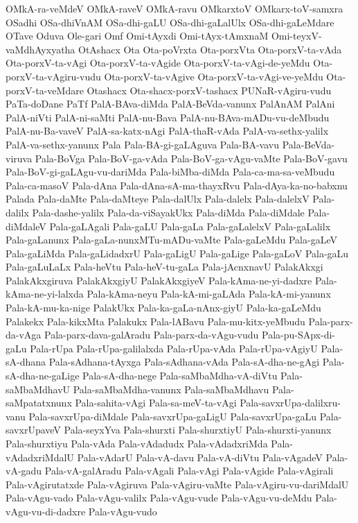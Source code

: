 {OMkA-ra-veMdeV
OMkA-raveV
OMkA-ravu
OMkarxtoV
OMkarx-toV-samxra
OSadhi
OSa-dhiVnAM
OSa-dhi-gaLU
OSa-dhi-gaLalUlx
OSa-dhi-gaLeMdare
OTave
Oduva
Ole-gari
Omf
Omi-tAyxdi
Omi-tAyx-tAmxnaM
Omi-teyxV-vaMdhAyxyatha
OtAshacx
Ota
Ota-poVrxta
Ota-porxVta
Ota-porxV-ta-vAda
Ota-porxV-ta-vAgi
Ota-porxV-ta-vAgide
Ota-porxV-ta-vAgi-de-yeMdu
Ota-porxV-ta-vAgiru-vudu
Ota-porxV-ta-vAgive
Ota-porxV-ta-vAgi-ve-yeMdu
Ota-porxV-ta-veMdare
Otashacx
Ota-shacx-porxV-tashacx
PUNaR-vAgiru-vudu
PaTa-doDane
PaTf
PalA-BAva-diMda
PalA-BeVda-vanunx
PalAnAM
PalAni
PalA-niVti
PalA-ni-saMti
PalA-nu-Bava
PalA-nu-BAva-mADu-vu-deMbudu
PalA-nu-Ba-vaveV
PalA-sa-katx-nAgi
PalA-thaR-vAda
PalA-va-sethx-yalilx
PalA-va-sethx-yanunx
Pala
Pala-BA-gi-gaLAguva
Pala-BA-vavu
Pala-BeVda-viruva
Pala-BoVga
Pala-BoV-ga-vAda
Pala-BoV-ga-vAgu-vaMte
Pala-BoV-gavu
Pala-BoV-gi-gaLAgu-vu-dariMda
Pala-biMba-diMda
Pala-ca-ma-sa-veMbudu
Pala-ca-masoV
Pala-dAna
Pala-dAna-sA-ma-thayxRvu
Pala-dAya-ka-no-babxnu
Palada
Pala-daMte
Pala-daMteye
Pala-dalUlx
Pala-dalelx
Pala-dalelxV
Pala-dalilx
Pala-dashe-yalilx
Pala-da-viSayakUkx
Pala-diMda
Pala-diMdale
Pala-diMdaleV
Pala-gaLAgali
Pala-gaLU
Pala-gaLa
Pala-gaLalelxV
Pala-gaLalilx
Pala-gaLanunx
Pala-gaLa-nunxMTu-mADu-vaMte
Pala-gaLeMdu
Pala-gaLeV
Pala-gaLiMda
Pala-gaLidadxrU
Pala-gaLigU
Pala-gaLige
Pala-gaLoV
Pala-gaLu
Pala-gaLuLaLx
Pala-heVtu
Pala-heV-tu-gaLa
Pala-jAcnxnavU
PalakAkxgi
PalakAkxgiruva
PalakAkxgiyU
PalakAkxgiyeV
Pala-kAma-ne-yi-dadxre
Pala-kAma-ne-yi-lalxda
Pala-kAma-neyu
Pala-kA-mi-gaLAda
Pala-kA-mi-yanunx
Pala-kA-mu-ka-nige
PalakUkx
Pala-ka-gaLa-nAnx-giyU
Pala-ka-gaLeMdu
Palakekx
Pala-kikxMta
Palakukx
Pala-lABavu
Pala-mu-kitx-yeMbudu
Pala-parx-da-vAga
Pala-parx-dava-galAradu
Pala-parx-da-vAgu-vudu
Pala-pu-SApx-di-gaLu
Pala-rUpa
Pala-rUpa-galilalxda
Pala-rUpa-vAda
Pala-rUpa-vAgiyU
Pala-sA-dhana
Pala-sAdhana-tAyxga
Pala-sAdhana-vAda
Pala-sA-dha-ne-gAgi
Pala-sA-dha-ne-gaLige
Pala-sA-dha-nege
Pala-saMbaMdha-vA-diVtu
Pala-saMbaMdhavU
Pala-saMbaMdha-vanunx
Pala-saMbaMdhavu
Pala-saMpatatxnunx
Pala-sahita-vAgi
Pala-sa-meV-ta-vAgi
Pala-savxrUpa-dalilxru-vanu
Pala-savxrUpa-diMdale
Pala-savxrUpa-gaLigU
Pala-savxrUpa-gaLu
Pala-savxrUpaveV
Pala-seyxYva
Pala-shurxti
Pala-shurxtiyU
Pala-shurxti-yanunx
Pala-shurxtiyu
Pala-vAda
Pala-vAdadudx
Pala-vAdadxriMda
Pala-vAdadxriMdalU
Pala-vAdarU
Pala-vA-davu
Pala-vA-diVtu
Pala-vAgadeV
Pala-vA-gadu
Pala-vA-galAradu
Pala-vAgali
Pala-vAgi
Pala-vAgide
Pala-vAgirali
Pala-vAgirutatxde
Pala-vAgiruva
Pala-vAgiru-vaMte
Pala-vAgiru-vu-dariMdalU
Pala-vAgu-vado
Pala-vAgu-valilx
Pala-vAgu-vude
Pala-vAgu-vu-deMdu
Pala-vAgu-vu-di-dadxre
Pala-vAgu-vudo
}
